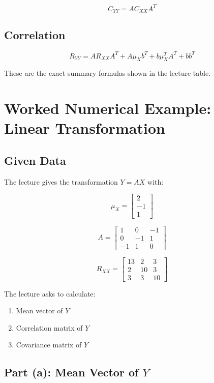 \documentclass[12pt]{article}
\begin{document}
\[
\boxed{C_{YY} = A C_{XX} A^T}
\]

\subsection{Correlation}

\[
\boxed{R_{YY} = A R_{XX} A^T + A\mu_X b^T + b\mu_X^T A^T + bb^T}
\]

These are the exact summary formulas shown in the lecture table.

\section{Worked Numerical Example: Linear Transformation}

\subsection{Given Data}

The lecture gives the transformation \(Y = AX\) with:

\[
\mu_X =
\begin{bmatrix}
2 \\
-1 \\
1
\end{bmatrix}
\]

\[
A =
\begin{bmatrix}
1 & 0 & -1 \\
0 & -1 & 1 \\
-1 & 1 & 0
\end{bmatrix}
\]

\[
R_{XX} =
\begin{bmatrix}
13 & 2 & 3 \\
2 & 10 & 3 \\
3 & 3 & 10
\end{bmatrix}
\]

The lecture asks to calculate:

\begin{enumerate}
    \item Mean vector of \(Y\)
    \item Correlation matrix of \(Y\)
    \item Covariance matrix of \(Y\)
\end{enumerate}

\subsection{Part (a): Mean Vector of \(Y\)}
\end{document}
